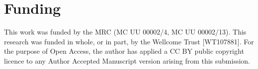 \documentclass[12pt]{article}
\begin{document}
\section*{Funding}
This work was funded by the MRC (MC UU 00002/4, MC UU 00002/13). This research was funded in whole, or in part, by the Wellcome Trust [WT107881]. For the purpose of Open Access, the author has applied a CC BY public copyright licence to any Author Accepted Manuscript version arising from this submission.
\vspace*{-12pt}

%
%

%
%
%
%
%
%
  









\end{document}
